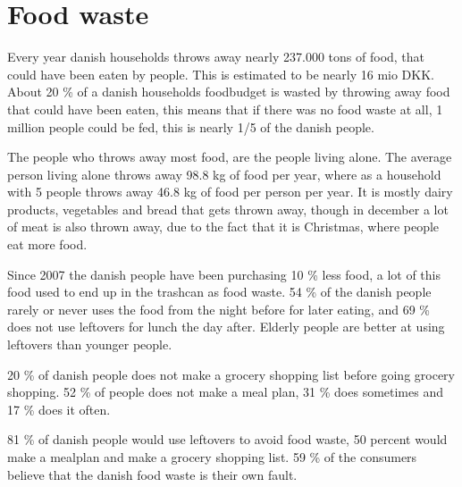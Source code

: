 \section{Food waste}
Every year danish households throws away nearly 237.000 tons of food\cite{maSpild_iTal}, that could have been eaten by people. This is estimated to be nearly 16 mio DKK. About 20 \% of a danish households foodbudget is wasted by throwing away food that could have been eaten, this means that if there was no food waste at all, 1 million people could be fed, this is nearly 1/5 of the danish people.

The people who throws away most food, are the people living alone. The average person living alone throws away 98.8 kg of food per year, where as a household with 5 people throws away 46.8 kg of food per person per year. It is mostly dairy products, vegetables and bread that gets thrown away, though in december a lot of meat is also thrown away, due to the fact that it is Christmas, where people eat more food.

Since 2007 the danish people have been purchasing 10 \% less food, a lot of this food used to end up in the trashcan as food waste. 54 \% of the danish people rarely or never uses the food from the night before for later eating, and 69 \% does not use leftovers for lunch the day after. Elderly people are better at using leftovers than younger people.

20 \% of danish people does not make a grocery shopping list before going grocery shopping. 52 \% of people does not make a meal plan, 31 \% does sometimes and 17 \% does it often.

81 \% of danish people would use leftovers to avoid food waste, 50 percent would make a mealplan and make a grocery shopping list. 59 \% of the consumers believe that the danish food waste is their own fault.
